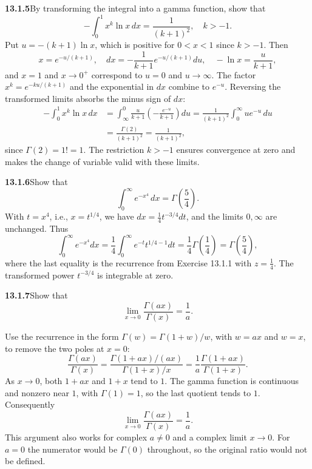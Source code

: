 \par\bigskip
\noindent\textbf{13.1.5}\quad By transforming the integral into a gamma
function, show that
\[
-\int_{0}^{1}x^{k}\ln x\,dx=\frac{1}{(k+1)^{2}},\quad k>-1.
\]
\solution
Put $u=-(k+1)\ln x$, which is positive for $0<x<1$ since $k>-1$.
Then
\[
x=e^{-u/(k+1)},\quad
 dx=-\frac1{k+1}e^{-u/(k+1)}du,\quad
 -\ln x=\frac u{k+1},
\]
and $x=1$ and $x\to0^+$ correspond to $u=0$ and $u\to\infty$.  The
factor $x^k=e^{-ku/(k+1)}$ and the exponential in $dx$ combine to
$e^{-u}$.  Reversing the transformed limits absorbs the minus sign
of $dx$:
\begin{align*}
-\int_0^1x^k\ln x\,dx
&=\int_\infty^0\frac u{k+1}\left(-\frac{e^{-u}}{k+1}\right)du
=\frac1{(k+1)^2}\int_0^\infty u e^{-u}\,du\\
&=\frac{\Gamma(2)}{(k+1)^2}
=\boxed{\frac1{(k+1)^2}},
\end{align*}
since $\Gamma(2)=1!=1$.
The restriction $k>-1$ ensures convergence at zero and makes the
change of variable valid with these limits.


\par\bigskip
\noindent\textbf{13.1.6}\quad Show that
\[
\int_{0}^{\infty}e^{-x^{4}}\,dx=\Gamma\left(\frac{5}{4}\right).
\]
\solution
With $t=x^4$, i.e., $x=t^{1/4}$, we have $dx=\tfrac14t^{-3/4}dt$,
and the limits $0,\infty$ are unchanged.  Thus
\[
\int_0^\infty e^{-x^4}dx
=\frac14\int_0^\infty e^{-t}t^{1/4-1}dt
=\frac14\Gamma\left(\frac14\right)
=\boxed{\Gamma\left(\frac54\right)},
\]
where the last equality is the recurrence from Exercise 13.1.1 with
$z=\tfrac14$.
The transformed power $t^{-3/4}$ is integrable at zero.


\par\bigskip
\noindent\textbf{13.1.7}\quad Show that
\[
\lim_{x\to0}\frac{\Gamma(ax)}{\Gamma(x)}=\frac{1}{a}.
\]
\par\smallskip
{}
\solution
{}
Use the recurrence in the form $\Gamma(w)=\Gamma(1+w)/w$, with
$w=ax$ and $w=x$, to remove the two poles at $x=0$:
\[
\frac{\Gamma(ax)}{\Gamma(x)}
=\frac{\Gamma(1+ax)/(ax)}{\Gamma(1+x)/x}
=\frac1a\frac{\Gamma(1+ax)}{\Gamma(1+x)}.
\]
As $x\to0$, both $1+ax$ and $1+x$ tend to $1$.  The gamma function is
continuous and nonzero near $1$, with $\Gamma(1)=1$, so the last
quotient tends to $1$.  Consequently
\[
\boxed{\lim_{x\to0}\frac{\Gamma(ax)}{\Gamma(x)}=\frac1a}.
\]
This argument also works for complex $a\ne0$ and a complex limit
$x\to0$.  For $a=0$ the numerator would be $\Gamma(0)$ throughout,
so the original ratio would not be defined.



